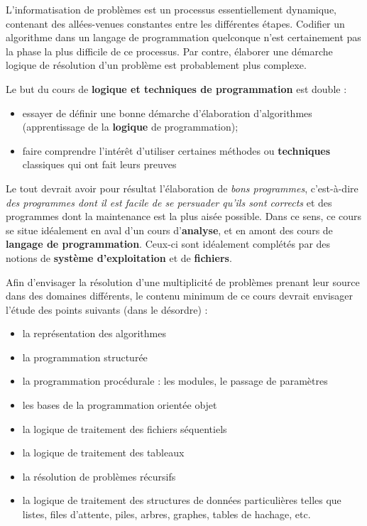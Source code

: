 	L’informatisation de problèmes est un processus essentiellement
	dynamique, contenant des allées-venues constantes entre les différentes
	étapes. Codifier un algorithme dans un langage de programmation
	quelconque n’est certainement pas la phase la plus difficile de ce
	processus. Par contre, élaborer une démarche logique de résolution d’un
	problème est probablement plus complexe.
	
	Le but du cours de \textbf{logique et techniques de programmation} est
	double :

	\begin{itemize}
	\item
		essayer de définir une bonne démarche d’élaboration d’algorithmes
		(apprentissage de la \textbf{logique} de programmation);
	\item
		faire comprendre l’intérêt d’utiliser certaines méthodes ou
		\textbf{techniques} classiques qui ont fait leurs preuves
	\end{itemize}

	Le tout devrait avoir pour résultat l’élaboration de \textit{bons
	programmes}, c’est-à-dire \textit{des programmes dont il est facile de
	se persuader qu’ils sont corrects} et des programmes dont la
	maintenance est la plus aisée possible. Dans ce sens, ce cours se situe
	idéalement en aval d’un cours d’\textbf{analyse}, et en amont des cours
	de \textbf{langage de programmation}. Ceux-ci sont idéalement complétés
	par des notions de \textbf{système d’exploitation} et de
	\textbf{fichiers}.

	Afin d’envisager la résolution d’une multiplicité de problèmes prenant
	leur source dans des domaines différents, le contenu minimum de ce
	cours devrait envisager l’étude des points suivants (dans le désordre)
	:

	\begin{itemize}
	\item 
		la représentation des algorithmes
	\item
		la programmation structurée
	\item
		la programmation procédurale : les modules, le passage de paramètres
	\item
		les bases de la programmation orientée objet
	\item
		la logique de traitement des fichiers séquentiels
	\item
		la logique de traitement des tableaux
	\item
		la résolution de problèmes récursifs
	\item
		la logique de traitement des structures de données particulières telles
		que listes, files d’attente, piles, arbres, graphes, tables de hachage,
		etc.
	\end{itemize}

